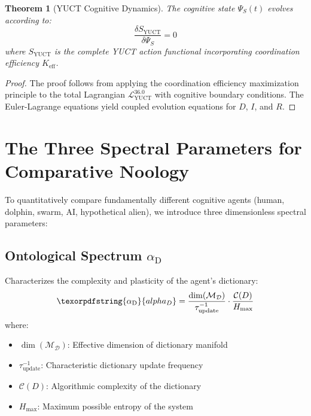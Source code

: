 \documentclass[12pt,a4paper]{article}
\newtheorem{theorem}{Theorem}
\DeclareRobustCommand{\alD}{\texorpdfstring{\ensuremath{\alpha_{\mathrm{D}}}}{alpha_D}}
\newcommand{\eff}{\mathrm{eff}}
\newcommand{\Dict}{\mathcal{D}}
\newcommand{\Mdict}{\mathcal{M}_{\Dict}}
\newcommand{\Ke}{K_{\eff}}
\begin{document}
	\begin{theorem}[YUCT Cognitive Dynamics]
		The cognitive state \(\Psi_S(t)\) evolves according to:
		\begin{equation}
			\label{eq:cognitive-dynamics}
			\frac{\delta S_{\mathrm{YUCT}}}{\delta \Psi_S} = 0
		\end{equation}
		where \(S_{\mathrm{YUCT}}\) is the complete YUCT action functional incorporating coordination efficiency \(\Ke\).
	\end{theorem}
	
	\begin{proof}
		The proof follows from applying the coordination efficiency maximization principle to the total Lagrangian \(\mathcal{L}_{\mathrm{YUCT}}^{36.0}\) with cognitive boundary conditions. The Euler-Lagrange equations yield coupled evolution equations for \(D\), \(I\), and \(R\).
	\end{proof}
	
	\section{The Three Spectral Parameters for Comparative Noology}
	
	To quantitatively compare fundamentally different cognitive agents (human, dolphin, swarm, AI, hypothetical alien), we introduce three dimensionless spectral parameters:
	
	\subsection{Ontological Spectrum \alD}
	
	Characterizes the complexity and plasticity of the agent's dictionary:
	\begin{equation}
		\label{eq:alphaD}
		\alD = \frac{\dim(\Mdict)}{\tau_{\mathrm{update}}^{-1}} \cdot \frac{\mathcal{C}(D)}{H_{\mathrm{max}}}
	\end{equation}
	where:
	\begin{itemize}
		\item \(\dim(\Mdict)\): Effective dimension of dictionary manifold
		\item \(\tau_{\mathrm{update}}^{-1}\): Characteristic dictionary update frequency
		\item \(\mathcal{C}(D)\): Algorithmic complexity of the dictionary
		\item \(H_{\mathrm{max}}\): Maximum possible entropy of the system
	\end{itemize}
	
\end{document}
